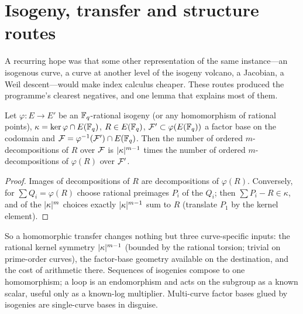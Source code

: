 \section{Isogeny, transfer and structure routes}\label{sec:transfer}

A recurring hope was that some other representation of the same
instance---an isogenous curve, a curve at another level of the isogeny
volcano, a Jacobian, a Weil descent---would make index calculus cheaper.
These routes produced the programme's clearest negatives, and one lemma
that explains most of them.

\begin{lemma}\label{lem:conservation}
Let $\varphi:E\to E'$ be an $\mathbb{F}_q$-rational isogeny (or any homomorphism
of rational points), $\kappa=\ker\varphi\cap E(\mathbb{F}_q)$, $R\in E(\mathbb{F}_q)$,
$\mathcal{F}'\subset\varphi(E(\mathbb{F}_q))$ a factor base on the codomain and
$\mathcal{F}=\varphi^{-1}(\mathcal{F}')\cap E(\mathbb{F}_q)$. Then the number of ordered
$m$-decompositions of $R$ over $\mathcal{F}$ is $\lvert \kappa \rvert^{m-1}$ times the number
of ordered $m$-decompositions of $\varphi(R)$ over $\mathcal{F}'$.
\end{lemma}
\begin{proof}
Images of decompositions of $R$ are decompositions of $\varphi(R)$.
Conversely, for $\sum Q_i=\varphi(R)$ choose rational preimages $P_i$ of
the $Q_i$; then $\sum P_i-R\in\kappa$, and of the $\lvert \kappa \rvert^m$ choices
exactly $\lvert \kappa \rvert^{m-1}$ sum to $R$ (translate $P_1$ by the kernel
element).
\end{proof}

So a homomorphic transfer changes nothing but three curve-specific inputs:
the rational kernel symmetry $\lvert \kappa \rvert^{m-1}$ (bounded by the rational
torsion; trivial on prime-order curves), the factor-base geometry
available on the destination, and the cost of arithmetic there. Sequences
of isogenies compose to one homomorphism; a loop is an endomorphism and
acts on the subgroup as a known scalar, useful only as a known-log
multiplier. Multi-curve factor bases glued by isogenies are single-curve
bases in disguise.

